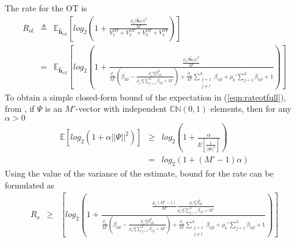 \documentclass[10pt, a4paper, twoside,fleqn]{article}
\begin{document}
The rate for the OT is
\begin{eqnarray}\label{eqn:rateotfull}
	R_{ol} &\triangleq& \mathbb{E}_{\pmb{\hat h}_{ell}}\left[log_2\left(1+\frac{\frac{\rho_o||\pmb{\hat h}_{ell}||^2}{M'}}{V_1^{OT}+V_2^{OT}+V_3^{OT}+V_4^{OT}}\right) \right] \nonumber \\
            &=&  \mathbb{E}_{\pmb{\hat h}_{ell}}\left[log_2\left(1+\frac{\frac{\rho_o||\pmb{\hat h}_{ell}||^2}{M'}}
								 {\frac{\rho_o}{M'}(\beta_{oll}-\frac{\rho_o\tau_p^o\beta^2_{oll}}{\rho_o\tau_p^o\sum\limits_{j=1}^{L}\beta_{ojl}+M'})        
								  + \frac{\rho_o}{M'} \sum\limits_{\substack{j=1 \\ j\neq l}}^{L} \beta_{ojl} 
								  +\rho_b'\sum\limits_{j=1}^{L}\beta_{ojl}
								  +1}\right) \right]	
\end{eqnarray}
To obtain a simple closed-form bound of the expectation in (\ref{eqn:rateotfull}), from \cite{bib:dtsysBook}, if $\Psi$ is an $M'$-vector with independent ${\mathbb C}{\mathbb N}(0,1)$ elements, then for any $\alpha>0$
\begin{eqnarray}\label{eqn:bound}
	\mathbb{E}[log_2(1+\alpha||\Psi||^2)] &\geq& log_2\left(1+\frac{\alpha}{E[\frac{1}{||\Psi||^2}]}\right) \nonumber \\
                                              &=&  log_2(1+(M'-1)\alpha)
\end{eqnarray}
Using the value of the variance of the estimate, bound for the rate can be formulated as
\begin{eqnarray}
	R_o &\geq& \left[log_2\left(1+\frac{\frac{\rho_o(M'-1)}{M'}\frac{\rho_o\tau_p^o\beta^2_{oll}}{\rho_o\tau_p^o\sum\limits_{j=1}^{L}\beta_{ojl}+M'}}
								 {\frac{\rho_o}{M'}(\beta_{oll}-\frac{\rho_o\tau_p^o\beta^2_{oll}}{\rho_o\tau_p^o\sum\limits_{j=1}^{L}\beta_{ojl}+M'})        
								  + \frac{\rho_o}{M'} \sum\limits_{\substack{j=1 \\ j\neq l}}^{L} \beta_{ojl} 
								  +\rho_b'\sum\limits_{j=1}^{L}\beta_{ojl}
								  +1}\right) \right]	
\end{eqnarray}
\end{document}
